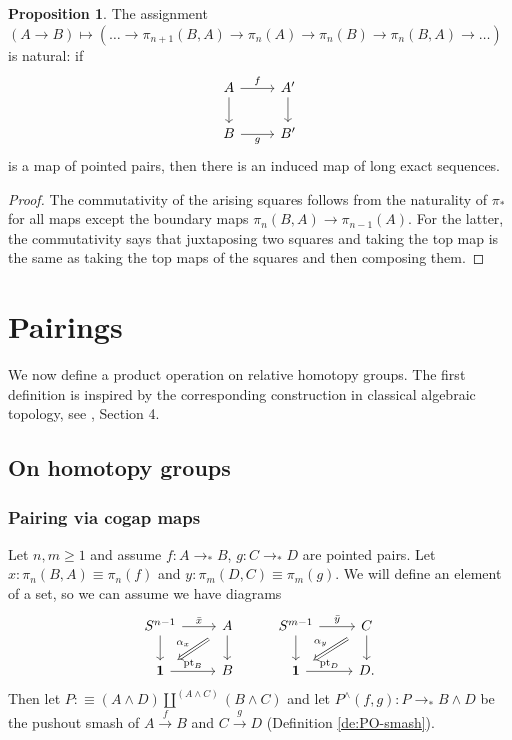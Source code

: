 \documentclass{amsart}
\theoremstyle{definition}
\newtheorem{prp}[theorem]{Proposition}
\newcommand{\bs}[1]{\mathrm{pt}_{#1}}
\newcommand{\pto}{\to_*}
\newcommand{\sgtn}{\mathbf{1}}
\begin{document}
\begin{prp}\label{pr:NaturalityLES}
    The assignment $(A \to B) \mapsto (\ldots \to \pi_{n+1}(B,A) \to \pi_n(A) \to \pi_n(B) \to \pi_n(B,A) \to \ldots)$ is natural: if
    \[\begin{tikzcd}
    	A & {A'} \\
    	B & {B'}
    	\arrow["f", from=1-1, to=1-2]
    	\arrow[from=1-1, to=2-1]
    	\arrow[from=1-2, to=2-2]
    	\arrow["g"', from=2-1, to=2-2]
    \end{tikzcd}\]
    is a map of pointed pairs, then there is an induced map of long exact sequences.

\end{prp}
\begin{proof}
    The commutativity of the arising squares follows from the naturality of $\pi_*$ for all maps except the boundary maps $\pi_n(B,A) \to \pi_{n-1}(A)$. For the latter, the commutativity says that juxtaposing two squares and taking the top map is the same as taking the top maps of the squares and then composing them.
\end{proof}



\section{Pairings}\label{se:pairings}

We now define a product operation on relative homotopy groups. The first definition is inspired by the corresponding construction in classical algebraic topology, see \cite{Dug1}, Section 4.

\subsection{On homotopy groups}

\subsubsection{Pairing via cogap maps}

Let $n,m \geq 1$ and assume $f: A \pto B$, $g: C \pto D$ are pointed pairs. Let $x :  \pi_n(B,A) \equiv \pi_n(f)$ and $y :  \pi_m(D,C) \equiv \pi_m(g).$ We will define an element of a set, so we can assume we have diagrams
\[\begin{tikzcd}
	{S^{n-1}} & A & {S^{m-1}} & C \\
	\sgtn & B & \sgtn & {D.}
	\arrow["{\bar{x}}", from=1-1, to=1-2]
	\arrow[from=1-1, to=2-1]
	\arrow["{\alpha_x}"', shorten <=6pt, shorten >=6pt, Rightarrow, from=1-2, to=2-1]
	\arrow[from=1-2, to=2-2]
	\arrow["{\bar{y}}", from=1-3, to=1-4]
	\arrow[from=1-3, to=2-3]
	\arrow["{\alpha_y}"', shorten <=6pt, shorten >=6pt, Rightarrow, from=1-4, to=2-3]
	\arrow[from=1-4, to=2-4]
	\arrow["{\bs{B}}", from=2-1, to=2-2]
	\arrow["{\bs{D}}", from=2-3, to=2-4]
\end{tikzcd}\]
Then let $P : \equiv {(A \wedge D) \coprod^{(A \wedge C)} (B \wedge C)}$ and let $P^\wedge(f,g) : P \pto B \wedge D$ be the pushout smash of $A \xrightarrow{f} B$ and $C \xrightarrow{g} D$ (Definition \ref{de:PO-smash}).
\end{document}
